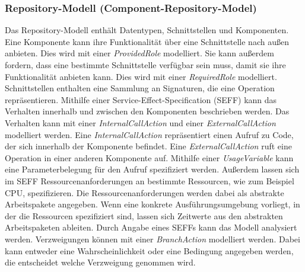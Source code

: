 \subsubsection{Repository-Modell (Component-Repository-Model)} 
Das Repository-Modell enthält Datentypen, Schnittstellen und Komponenten. Eine Komponente kann ihre Funktionalität über eine Schnittstelle nach außen anbieten. Dies wird mit einer \emph{ProvidedRole} modelliert. Sie kann außerdem fordern, dass eine bestimmte Schnittstelle verfügbar sein muss, damit sie ihre Funktionalität anbieten kann. Dies wird mit einer \emph{RequiredRole} modelliert. Schnittstellen enthalten eine Sammlung an Signaturen, die eine Operation repräsentieren. 
Mithilfe einer Service-Effect-Specification (SEFF) kann das Verhalten innerhalb und zwischen den Komponenten beschrieben werden. Das Verhalten kann mit einer \emph{InternalCallAction} und einer \emph{ExternalCallAction} modelliert werden. Eine \emph{InternalCallAction} repräsentiert einen Aufruf zu Code, der sich innerhalb der Komponente befindet. Eine \emph{ExternalCallAction} ruft eine Operation in einer anderen Komponente auf. Mithilfe einer \emph{UsageVariable} kann eine Parameterbelegung für den Aufruf spezifiziert werden. Außerdem lassen sich im SEFF Ressourcenanforderungen an bestimmte Ressourcen, wie zum Beispiel CPU,  spezifizieren. Die Ressourcenanforderungen werden dabei als abstrakte Arbeitspakete angegeben. Wenn eine konkrete Ausführungsumgebung vorliegt, in der die Ressourcen spezifiziert sind, lassen sich Zeitwerte aus den abstrakten Arbeitspaketen ableiten. Durch Angabe eines SEFFs kann das Modell analysiert werden.
Verzweigungen können mit einer \emph{BranchAction} modelliert werden. Dabei kann entweder eine Wahrscheinlichkeit oder eine Bedingung angegeben werden, die entscheidet welche Verzweigung genommen wird. 
